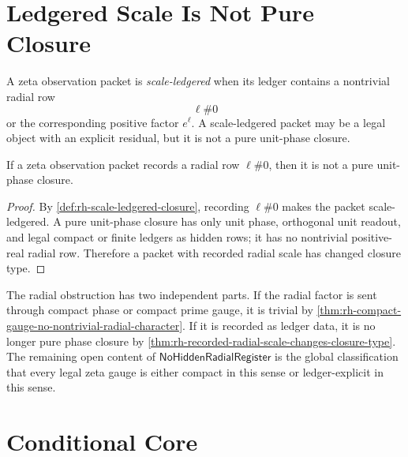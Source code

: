 \section{Ledgered Scale Is Not Pure Closure}
\label{sec:rh-radial-ledgered-scale-not-pure-closure}

\begin{definition}
\label{def:rh-scale-ledgered-closure}
A zeta observation packet is \emph{scale-ledgered} when its ledger
contains a nontrivial radial row
$$
\ell\#0
$$
or the corresponding positive factor $e^{\ell}$. A scale-ledgered packet
may be a legal object with an explicit residual, but it is not a pure
unit-phase closure.
\end{definition}

\begin{theorem}
\label{thm:rh-recorded-radial-scale-changes-closure-type}
If a zeta observation packet records a radial row $\ell\#0$, then it is
not a pure unit-phase closure.
\end{theorem}

\begin{proof}
By \autoref{def:rh-scale-ledgered-closure}, recording $\ell\#0$ makes the
packet scale-ledgered. A pure unit-phase closure has only unit phase,
orthogonal unit readout, and legal compact or finite ledgers as hidden
rows; it has no nontrivial positive-real radial row. Therefore a packet
with recorded radial scale has changed closure type.
\end{proof}

\begin{principle}
\label{prin:rh-two-ways-radial-factor-refused}
The radial obstruction has two independent parts. If the radial factor is
sent through compact phase or compact prime gauge, it is trivial by
\autoref{thm:rh-compact-gauge-no-nontrivial-radial-character}. If it is
recorded as ledger data, it is no longer pure phase closure by
\autoref{thm:rh-recorded-radial-scale-changes-closure-type}. The
remaining open content of $\mathsf{NoHiddenRadialRegister}$ is the global
classification that every legal zeta gauge is either compact in this
sense or ledger-explicit in this sense.
\end{principle}

\section{Conditional Core}
\label{sec:rh-radial-register-conditional-core}

